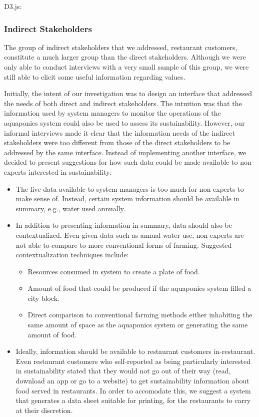 \documentclass{sigchi}
\begin{document}
D3.js: \cite{d3js}
 
 
\subsubsection{Indirect Stakeholders}

The group of indirect stakeholders that we addressed, restaurant customers, constitute a much larger group than the direct stakeholders. Although we were only able to conduct interviews with a very small sample of this group, we were still able to elicit some useful information regarding values. 

Initially, the intent of our investigation was to design an interface that addressed the needs of both direct and indirect stakeholders. The intuition was that the information used by system managers to monitor the operations of the aquaponics system could also be used to assess its sustainability. However, our informal interviews made it clear that the information needs of the indirect stakeholders were too different from those of the direct stakeholders to be addressed by the same interface. Instead of implementing another interface, we decided to present suggestions for how such data could be made available to non-experts interested in sustainability:
\begin{itemize}
\item The live data available to system managers is too much for non-experts to make sense of. Instead, certain system information should be available in summary, e.g., water used annually.
\item In addition to presenting information in summary, data should also be contextualized. Even given data such as annual water use, non-experts are not able to compare to more conventional forms of farming. Suggested contextualization techniques include:
	\begin{itemize}
	\item Resources consumed in system to create a plate of food.
	\item Amount of food that could be produced if the aquaponics system filled a city block. 
	\item Direct comparison to conventional farming methods either inhabiting the same amount of space as the aquaponics system or generating the same amount of food.
	\end{itemize}
\item Ideally, information should be available to restaurant customers in-restaurant. Even restaurant customers who self-reported as being particularly interested in sustainability stated that they would not go out of their way (read, download an app or go to a website) to get sustainability information about food served in restaurants. In order to accomodate this, we suggest a system that generates a data sheet suitable for printing, for the restaurants to carry at their discretion. 
\end{itemize}
\end{document}
